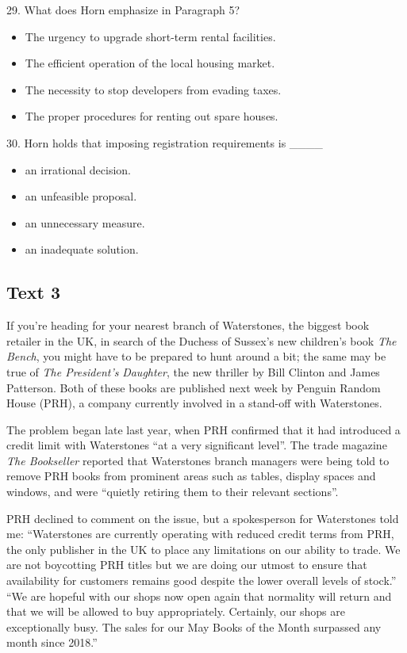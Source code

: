 \documentclass[UTF8,11pt]{ctexart}
\begin{document}
29. What does Horn emphasize in Paragraph 5?


\begin{itemize}[leftmargin=2em,itemsep=.2em,topsep=.4em]\item[A.] The urgency to upgrade short-term rental facilities.
\item[B.] The efficient operation of the local housing market.
\item[C.] The necessity to stop developers from evading taxes.
\item[D.] The proper procedures for renting out spare houses.
\end{itemize}

30. Horn holds that imposing registration requirements is \_\_\_\_


\begin{itemize}[leftmargin=2em,itemsep=.2em,topsep=.4em]\item[A.] an irrational decision.
\item[B.] an unfeasible proposal.
\item[C.] an unnecessary measure.
\item[D.] an inadequate solution.
\end{itemize}

\subsection*{\textbf{Text 3}}


If you’re heading for your nearest branch of Waterstones, the biggest book retailer in the UK, in search of the Duchess of Sussex’s new children’s book \textit{The Bench}, you might have to be prepared to hunt around a bit; the same may be true of \textit{The President’s} \textit{Daughter}, the new thriller by Bill Clinton and James Patterson. Both of these books are published next week by Penguin Random House (PRH), a company currently involved in a stand-off with Waterstones.


The problem began late last year, when PRH confirmed that it had introduced a credit limit with Waterstones “at a very significant level”. The trade magazine \textit{The Bookseller} reported that Waterstones branch managers were being told to remove PRH books from prominent areas such as tables, display spaces and windows, and were “quietly retiring them to their relevant sections”.


PRH declined to comment on the issue, but a spokesperson for Waterstones told me: “Waterstones are currently operating with reduced credit terms from PRH, the only publisher in the UK to place any limitations on our ability to trade. We are not boycotting PRH titles but we are doing our utmost to ensure that availability for customers remains good despite the lower overall levels of stock.” “We are hopeful with our shops now open again that normality will return and that we will be allowed to buy appropriately. Certainly, our shops are exceptionally busy. The sales for our May Books of the Month surpassed any month since 2018.”
\end{document}

